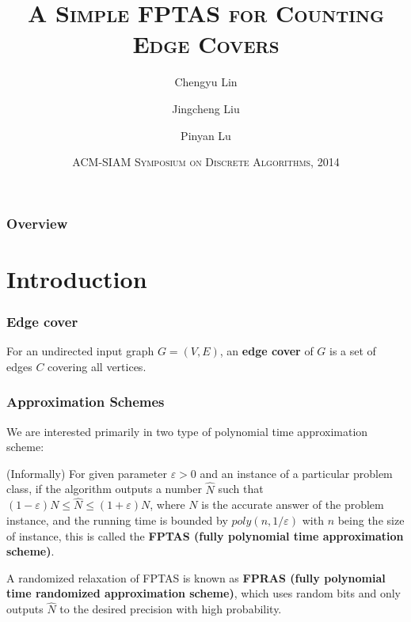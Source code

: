 \documentclass[mathserif]{beamer}
\title[\scshape Counting Edge Covers]{\scshape A Simple FPTAS for Counting Edge Covers}
\author[C. Lin, J. Liu, P. Lu]{Chengyu Lin\inst{1} \and Jingcheng Liu\inst{1} \and Pinyan Lu\inst{2}}
\institute[SJTU, MSRA]{\scshape \inst{1} Shanghai Jiao Tong University \and \inst{2} Microsoft Research Asia}
\date[SODA 2014]{\scshape ACM-SIAM Symposium on Discrete Algorithms, 2014}
\newcommand{\eps}{\varepsilon}
\begin{document}
\begin{frame}
	\titlepage
\end{frame}

\begin{frame}
	\frametitle{Overview}
	\tableofcontents
\end{frame}

\section{Introduction}

\begin{frame}
	\frametitle{Edge cover}
	\begin{definition}
		For an undirected input graph $G=(V,E)$, an {\bf edge cover} of $G$ is a set of edges $C$ covering all vertices.
	\end{definition}
	\begin{example}
		
	\end{example}
\end{frame}

\begin{frame}
	\frametitle{Approximation Schemes}
	We are interested primarily in two type of polynomial time approximation scheme:
	\pause
	\begin{definition}
		(Informally) For given parameter $\eps > 0$ and an instance of a particular problem class, if the algorithm outputs a number $\hat{N}$ such that $(1-\eps) N \leq \hat{N} \leq (1+\eps) N$, where $N$ is the accurate answer of the problem instance, and the running time is bounded by $poly(n, 1/ \eps)$ with $n$ being the size of instance, this is called the {\bf FPTAS (fully polynomial time approximation scheme)}.

		A randomized relaxation of FPTAS is known as {\bf FPRAS (fully polynomial time randomized approximation scheme)}, which uses random bits and only outputs $\hat{N}$ to the desired precision with high probability.
	\end{definition}
\end{frame}
\end{document}
